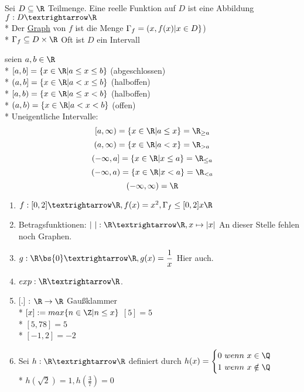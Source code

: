 Sei $D\subseteq\R$ Teilmenge. Eine reelle Funktion auf $D$ ist eine Abbildung $f:D→\R$\\*
%
Der \ul{Graph} von $f$ ist die Menge $\Gamma_f = \/(x, f(x) | x \in D \}$) \\*
$ \Gamma_f \subseteq D \times \R$ 
%
\bem Oft ist $D$ ein Intervall
%
\begin{wrapfigure}{r}{0.2\textwidth}
  \begin{center}
  \end{center}
\end{wrapfigure}
seien $a, b \in \R$ \\*
$[a, b] = \{x \in \R| a \leq x \leq b\}$ (abgeschlossen)\\*
$(a, b] = \{x \in \R| a < x \leq b\}$ (halboffen)\\*
$[a, b) = \{x \in \R| a \leq x < b\}$ (halboffen)\\* %
$(a, b) = \{x \in \R| a < x < b\}$ (offen)\\*
%
Uneigentliche Intervalle:
$$[a, \infty) = \{x \in \R | a \leq x\} = \R_{\geq a}$$
$$(a, \infty) = \{x \in \R | a < x\} = \R_{> a}$$
$$(- \infty, a] = \{x \in \R | x \leq a\} = \R_{\leq a}$$
$$(- \infty, a) = \{x \in \R | x < a\} = \R_{< a}$$
$$(- \infty, \infty) = \R$$
%
\begin{enumerate}
\item{$f:[0,2]→\R, f(x)=x^2, \Gamma_f \leq [0,2] x\R$}
\item{Betragsfunktionen: $|\ |: \R→\R, x\mapsto|x|$
}
An dieser Stelle fehlen noch Graphen.
\item{$g:\R\bs\{0\}→\R, g(x)=\dfrac{1}{x}$
Hier auch.
}
\item{$exp:\R→\R$.}
\item{[.] : $\R \to \R$ Gaußklammer\\*
$[x] := max\{n \in \Z | n \leq x \}$
\bsp
$[5] = 5$\\*
$[5,78] = 5$\\*
$[-1,2] = -2$}
\item{Sei $h:\R→\R$ definiert durch $h(x)=\begin{cases}0\ wenn\ x\in\Q\\* 1\ wenn\ x\notin\Q\end{cases}$\\*
$h(\sqrt{2}) = 1, h (\frac{3}{7}) = 0$}
\end{enumerate}

